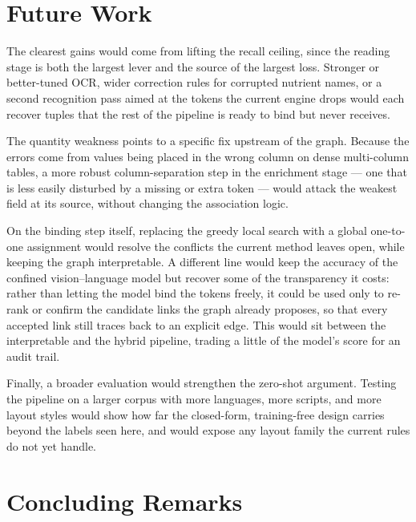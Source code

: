 \section{Future Work}\label{sec:concl-future}

The clearest gains would come from lifting the recall ceiling, since the reading
stage is both the largest lever and the source of the largest loss. Stronger or
better-tuned OCR, wider correction rules for corrupted nutrient names, or a second
recognition pass aimed at the tokens the current engine drops would each recover
tuples that the rest of the pipeline is ready to bind but never receives.

The quantity weakness points to a specific fix upstream of the graph. Because the
errors come from values being placed in the wrong column on dense multi-column
tables, a more robust column-separation step in the enrichment stage --- one that
is less easily disturbed by a missing or extra token --- would attack the weakest
field at its source, without changing the association logic.

On the binding step itself, replacing the greedy local search with a global
one-to-one assignment would resolve the conflicts the current method leaves open,
while keeping the graph interpretable. A different line would keep the accuracy of
the confined vision--language model but recover some of the transparency it costs:
rather than letting the model bind the tokens freely, it could be used only to
re-rank or confirm the candidate links the graph already proposes, so that every
accepted link still traces back to an explicit edge. This would sit between the
interpretable and the hybrid pipeline, trading a little of the model's score for
an audit trail.

Finally, a broader evaluation would strengthen the zero-shot argument. Testing the
pipeline on a larger corpus with more languages, more scripts, and more layout
styles would show how far the closed-form, training-free design carries beyond the
labels seen here, and would expose any layout family the current rules do not yet
handle.

\section{Concluding Remarks}\label{sec:concl-closing}

